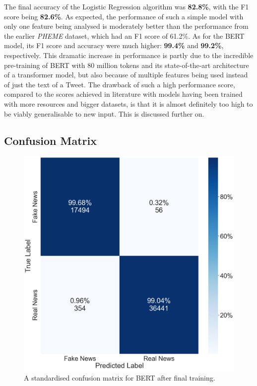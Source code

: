 \documentclass{l4proj}
\begin{document}
The final accuracy of the Logistic Regression algorithm was \textbf{82.8\%}, with the F1 score being \textbf{82.6\%}. As expected, the performance of such a simple model with only one feature being analysed is moderately better than the performance from the earlier \textit{PHEME} dataset, which had an F1 score of 61.2\%. As for the BERT model, its F1 score and accuracy were much higher: \textbf{99.4\%} and \textbf{99.2\%}, respectively. This dramatic increase in performance is partly due to the incredible pre-training of BERT with 80 million tokens and its state-of-the-art architecture of a transformer model, but also because of multiple features being used instead of just the text of a Tweet. The drawback of such a high performance score, compared to the scores achieved in literature with models having been trained with more resources and bigger datasets, is that it is almost definitely too high to be viably generalisable to new input. This is discussed further on.

\subsection{Confusion Matrix}
\label{sec:ConfMatrix}

\begin{figure}
    \centering
    \includegraphics[width=0.8\linewidth]{images/Evaluation/conf_matrix_w_pct.png}    

    \caption{A standardised confusion matrix for BERT after final training.}
    \label{fig:eval_confusion_matrix} 
\end{figure}
\end{document}
